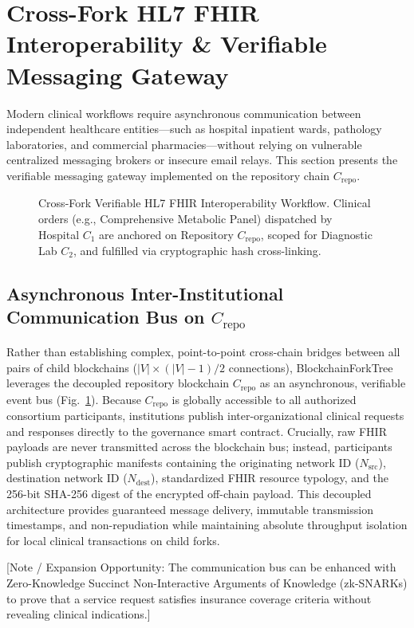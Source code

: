 \section{Cross-Fork HL7 FHIR Interoperability \& Verifiable Messaging Gateway}
\label{sec:fhir_messaging}

Modern clinical workflows require asynchronous communication between independent healthcare entities—such as hospital inpatient wards, pathology laboratories, and commercial pharmacies—without relying on vulnerable centralized messaging brokers or insecure email relays. This section presents the verifiable messaging gateway implemented on the repository chain $C_{\text{repo}}$.

\begin{figure}[t]
\centering

\caption{Cross-Fork Verifiable HL7 FHIR Interoperability Workflow. Clinical orders (e.g., Comprehensive Metabolic Panel) dispatched by Hospital $C_1$ are anchored on Repository $C_{\text{repo}}$, scoped for Diagnostic Lab $C_2$, and fulfilled via cryptographic hash cross-linking.}
\label{fig:fhir_messaging}
\end{figure}

\subsection{Asynchronous Inter-Institutional Communication Bus on $C_{\text{repo}}$}
Rather than establishing complex, point-to-point cross-chain bridges between all pairs of child blockchains ($|V| \times (|V|-1) / 2$ connections), BlockchainForkTree leverages the decoupled repository blockchain $C_{\text{repo}}$ as an asynchronous, verifiable event bus (Fig.~\ref{fig:fhir_messaging}). Because $C_{\text{repo}}$ is globally accessible to all authorized consortium participants, institutions publish inter-organizational clinical requests and responses directly to the governance smart contract. Crucially, raw FHIR payloads are never transmitted across the blockchain bus; instead, participants publish cryptographic manifests containing the originating network ID ($N_{\text{src}}$), destination network ID ($N_{\text{dest}}$), standardized FHIR resource typology, and the 256-bit SHA-256 digest of the encrypted off-chain payload. This decoupled architecture provides guaranteed message delivery, immutable transmission timestamps, and non-repudiation while maintaining absolute throughput isolation for local clinical transactions on child forks.

[Note / Expansion Opportunity: The communication bus can be enhanced with Zero-Knowledge Succinct Non-Interactive Arguments of Knowledge (zk-SNARKs) to prove that a service request satisfies insurance coverage criteria without revealing clinical indications.]

